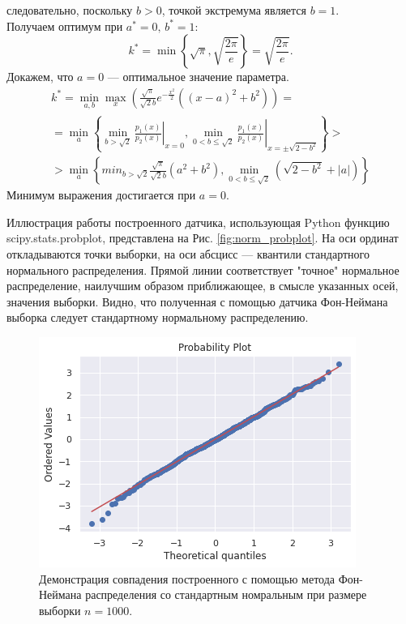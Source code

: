 следовательно, поскольку $b > 0$, точкой экстремума является $b = 1$.\\
Получаем оптимум при $a^* = 0,\, b^* = 1:$
$$
    k^* = \min\left\{\sqrt{\pi}, \sqrt{\frac{2\pi}{e}}\right\} = 
     \sqrt{\frac{2\pi}{e}}.
$$
Докажем, что $a = 0$ --- оптимальное значение параметра.
\begin{multline}
    k^* = \min_{a, b} \max_x \left( \frac{\sqrt{\pi}}{\sqrt{2}b} e^{-\frac{x^2}{2}}
     \left((x - a)^2 + b^2\right)\right) = \\
    = \min_a\left\{\min_{b > \sqrt{2}}\left.\frac{p_1(x)}{p_2(x)}\right|_{x = 0},
     \left.\min_{0 < b\leq\sqrt{2}}\frac{p_1(x)}{p_2(x)}\right|_{x =
     \pm\sqrt{2 - b^2}}\right\} > \\
    > \min_a\left\{min_{b > \sqrt{2}}\frac{\sqrt{\pi}}{\sqrt{2}b}
     \left(a^2 + b^2\right), \min_{0 < b \leq \sqrt{2}} \left( \sqrt{2 - b^2} +
     |a|\right)\right\}
\end{multline}
Минимум выражения достигается при $a = 0$.

Иллюстрация работы построенного датчика, использующая Python функцию
 scipy.stats.probplot, представлена на Рис. \eqref{fig:norm_probplot}. На оси ординат
 откладываются точки выборки, на оси абсцисс --- квантили стандартного нормального
 распределения. Прямой линии соответствует "точное"  нормальное распределение,
 наилучшим образом приближающее, в смысле указанных осей, значения выборки. Видно, 
 что полученная с помощью датчика Фон-Неймана выборка следует стандартному нормальному
 распределению.

\begin{figure}[ht]
	\centering
	\includegraphics[width = 0.7\linewidth]{"./resources/norm_probplot.png"}
	\caption{Демонстрация совпадения построенного с помощью метода Фон-Неймана
     распределения со стандартным номральным при размере выборки $ n = 1000 $.}
    \label{fig:norm_probplot}
\end{figure}

